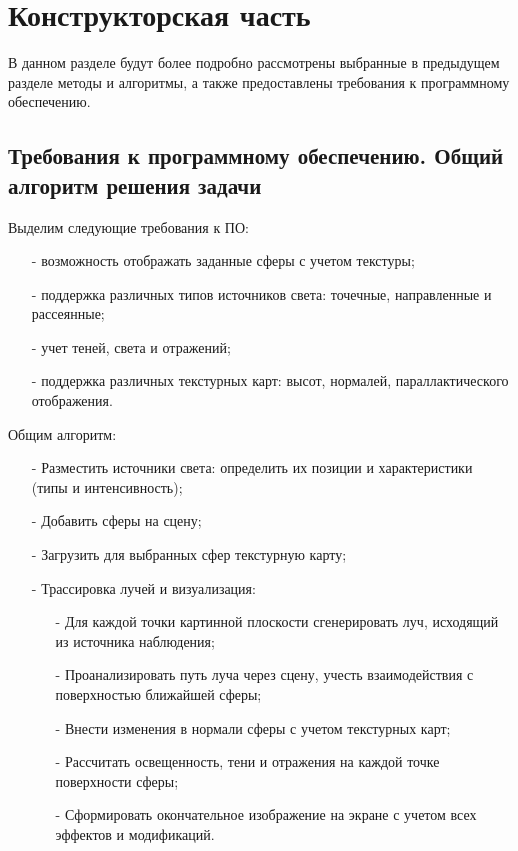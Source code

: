\chapter{Конструкторская часть}

В данном разделе будут более подробно рассмотрены выбранные в предыдущем разделе методы и алгоритмы, а также предоставлены требования к программному обеспечению.

\section{Требования к программному обеспечению. Общий алгоритм решения задачи}

Выделим следующие требования к ПО:
\begin{itemize}[label=\arabic*)]
	\item[-] возможность отображать заданные сферы с учетом текстуры;
	\item[-] поддержка различных типов источников света: точечные, направленные и рассеянные;
	\item[-] учет теней, света и отражений;
	\item[-] поддержка различных текстурных карт: высот, нормалей, параллактического отображения.
\end{itemize}

Общим алгоритм:
\begin{itemize}[label=\arabic*)]
	\item[-] Разместить источники света: определить их позиции и характеристики (типы и интенсивность);
	\item[-] Добавить сферы на сцену;
	\item[-] Загрузить для выбранных сфер текстурную карту;
	\item[-] Трассировка лучей и визуализация:
	\begin{itemize}[label=\arabic*)]
		\item[-] Для каждой точки картинной плоскости сгенерировать луч, исходящий из источника наблюдения;
		\item[-] Проанализировать путь луча через сцену, учесть взаимодействия с поверхностью ближайшей сферы;
		\item[-] Внести изменения в нормали сферы с учетом текстурных карт;
		\item[-] Рассчитать освещенность, тени и отражения на каждой точке поверхности сферы;
		\item[-] Сформировать окончательное изображение на экране с учетом всех эффектов и модификаций.
	\end{itemize}
\end{itemize}

